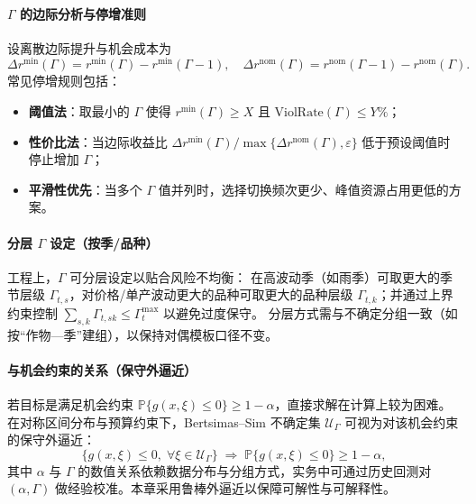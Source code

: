 \paragraph{$\Gamma$ 的边际分析与停增准则}
设离散边际提升与机会成本为
\begin{equation}
  \Delta r^{\min}(\Gamma)=r^{\min}(\Gamma)-r^{\min}(\Gamma-1),\quad
  \Delta r^{\mathrm{nom}}(\Gamma)=r^{\mathrm{nom}}(\Gamma-1)-r^{\mathrm{nom}}(\Gamma).\label{eq:marginal-gamma}
\end{equation}
常见停增规则包括：
\begin{itemize}
  \item \textbf{阈值法}：取最小的 $\Gamma$ 使得 $r^{\min}(\Gamma)\ge X$ 且 $\text{ViolRate}(\Gamma)\le Y\%$；
  \item \textbf{性价比法}：当边际收益比 $\Delta r^{\min}(\Gamma)/\max\{\Delta r^{\mathrm{nom}}(\Gamma),\varepsilon\}$ 低于预设阈值时停止增加 $\Gamma$；
  \item \textbf{平滑性优先}：当多个 $\Gamma$ 值并列时，选择切换频次更少、峰值资源占用更低的方案。
\end{itemize}

\paragraph{分层 $\Gamma$ 设定（按季/品种）}
工程上，$\Gamma$ 可分层设定以贴合风险不均衡：
在高波动季（如雨季）可取更大的季节层级 $\Gamma_{t,s}$，对价格/单产波动更大的品种可取更大的品种层级 $\Gamma_{t,k}$；并通过上界约束控制 $\sum_{s,k} \Gamma_{t,sk}\le \Gamma_t^{\max}$ 以避免过度保守。
分层方式需与不确定分组一致（如按“作物—季”建组），以保持对偶模板口径不变。

\paragraph{与机会约束的关系（保守外逼近）}
若目标是满足机会约束 $\mathbb{P}\{g(x,\xi)\le0\}\ge1-\alpha$，直接求解在计算上较为困难。在对称区间分布与预算约束下，Bertsimas–Sim 不确定集 $\mathcal{U}_\Gamma$ 可视为对该机会约束的保守外逼近：
\begin{equation}
  \{g(x,\xi)\le0,\;\forall\xi\in\mathcal{U}_\Gamma\}\;\Rightarrow\;\mathbb{P}\{g(x,\xi)\le0\}\ge1-\alpha,\label{rel:chance}
\end{equation}
其中 $\alpha$ 与 $\Gamma$ 的数值关系依赖数据分布与分组方式，实务中可通过历史回测对 $(\alpha,\Gamma)$ 做经验校准。本章采用鲁棒外逼近以保障可解性与可解释性。

